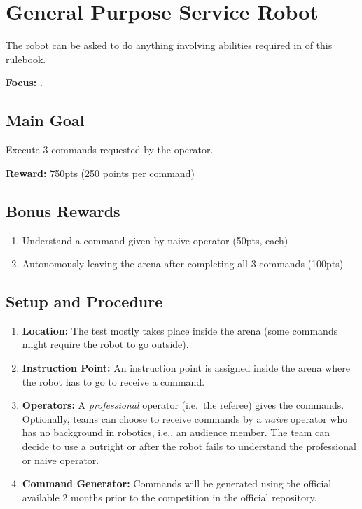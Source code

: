 \section{General Purpose Service Robot}
\label{test:gpsr}
The robot can be asked to do anything involving abilities required in \SONE{} of this rulebook.

\noindent \textbf{Focus:} \SysI.

\subsection*{Main Goal}
Execute 3 commands requested by the operator.

\noindent\textbf{Reward:} 750pts (250 points per command)

\subsection*{Bonus Rewards}
\begin{enumerate}[nosep]
	\item Understand a command given by naive operator (50pts, each)
	\item Autonomously leaving the arena after completing all 3 commands (100pts)
\end{enumerate}

%
%
\subsection*{Setup and Procedure}
\begin{enumerate}[nosep]
	\item \textbf{Location:} The test mostly takes place inside the arena (some commands might require the robot to go outside).
	
	\item \textbf{Instruction Point:} An instruction point is assigned inside the arena where the robot has to go to receive a command.
	
	\item \textbf{Operators:} A \emph{professional} operator (i.e.~the referee) gives the commands. Optionally, teams can choose to receive commands by a \emph{naive} operator who has no background in robotics, i.e., an audience member. The team can decide to use a \CustomOperator{} outright or after the robot fails to understand the professional or naive operator.
	
	\item \textbf{Command Generator:} Commands will be generated using the official \CommandGen{} available 2 months prior to the competition in the official repository\footnotemark {}.
\end{enumerate}


